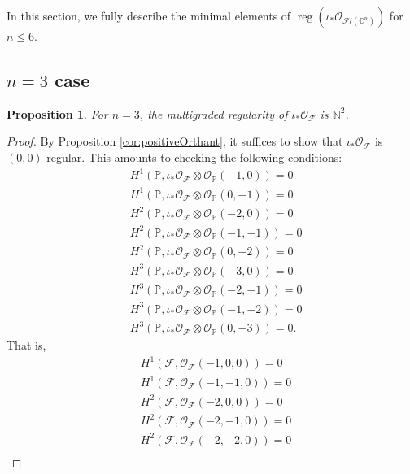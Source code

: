 \documentclass[12pt,reqno]{amsart}
\newtheorem{proposition}[theorem]{Proposition}
\theoremstyle{definition}
\theoremstyle{remark}
\newcommand{\reg}{\operatorname{reg}}
\newcommand{\calF}{{\mathcal{F}}}
\newcommand{\calO}{{\mathcal{O}}}
\begin{document}
In this section, we fully describe the minimal elements of $\reg(\iota_*\calO_{\calF l(\mathbb C^n)})$ for $n\leq 6$.

\subsection{$n=3$ case}

\begin{proposition}\label{prop:n=3}
    For $n=3$, the multigraded regularity of $\iota_*\calO_{\calF}$ is $\mathbb N^2$.
\end{proposition}

\begin{proof}
    By Proposition \ref{cor:positiveOrthant}, it suffices to show that  $\iota_*\calO_{\calF}$ is $(0,0)$-regular.  This amounts to checking the following conditions: 
    \begin{align*}
        &H^1(\mathbb P,\iota_*\calO_{\calF}\otimes \calO_{\mathbb P}(-1,0)) = 0\\
        &H^1(\mathbb P,\iota_*\calO_{\calF}\otimes \calO_{\mathbb P}(0,-1)) = 0\\
        &H^2(\mathbb P,\iota_*\calO_{\calF}\otimes \calO_{\mathbb P}(-2,0)) = 0\\
        &H^2(\mathbb P,\iota_*\calO_{\calF}\otimes \calO_{\mathbb P}(-1,-1)) = 0\\
        &H^2(\mathbb P,\iota_*\calO_{\calF}\otimes \calO_{\mathbb P}(0,-2)) = 0\\
        &H^3(\mathbb P,\iota_*\calO_{\calF}\otimes \calO_{\mathbb P}(-3,0)) = 0\\
        &H^3(\mathbb P,\iota_*\calO_{\calF}\otimes \calO_{\mathbb P}(-2,-1)) = 0\\
        &H^3(\mathbb P,\iota_*\calO_{\calF}\otimes \calO_{\mathbb P}(-1,-2)) = 0\\
        &H^3(\mathbb P,\iota_*\calO_{\calF}\otimes \calO_{\mathbb P}(0,-3)) = 0.
    \end{align*}
    That is,
    \begin{align}
        &H^1(\calF,\calO_{\calF}(-1,0,0)) = 0 \label{eqn:n3-1}\\
        &H^1(\calF,\calO_{\calF}(-1,-1,0)) = 0 \label{eqn:n3-2}\\
        &H^2(\calF,\calO_{\calF}(-2,0,0)) = 0 \label{eqn:n3-3}\\
        &H^2(\calF,\calO_{\calF}(-2,-1,0)) = 0 \label{eqn:n3-4}\\
        &H^2(\calF,\calO_{\calF}(-2,-2,0)) = 0 \label{eqn:n3-5}\\

\end{align}
\end{proof}
\end{document}
